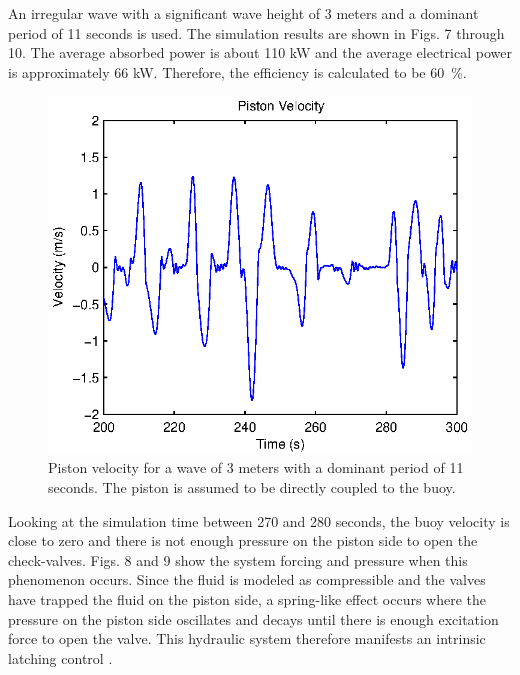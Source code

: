 \documentclass[conference]{IEEEtran}
\begin{document}
An irregular wave with a significant wave height of 3 meters and a dominant period of 11 seconds is used.  The simulation results are shown in Figs. 7 through 10.  The average absorbed power is about 110 kW and the average electrical power is approximately 66 kW. Therefore, the efficiency is calculated to be 60~\%. 

\begin{figure}[t]
    \centering
    \includegraphics[width=1\columnwidth]{Images/zDot}
    \caption{Piston velocity for a wave of 3 meters with a dominant period of 11 seconds. The piston is assumed to be directly coupled to the buoy.}
    \end{figure}

Looking at the simulation time between 270 and 280 seconds, the buoy velocity is close to zero and there is not enough pressure on the piston side to open the check-valves. Figs. 8 and 9 show the system forcing and pressure when this phenomenon occurs. Since the fluid is modeled as compressible and the valves have trapped the fluid on the piston side, a spring-like effect occurs where the pressure on the piston side oscillates and decays until there is enough excitation force to open the valve. This hydraulic system therefore manifests an intrinsic latching control \cite{falnes2005ocean}.
\end{document}
